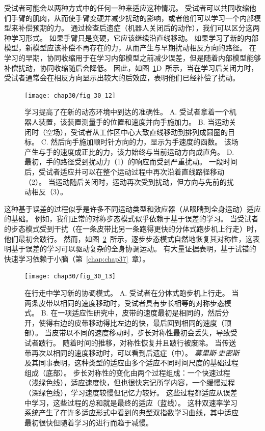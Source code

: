 受试者可能会以两种方式中的任何一种来适应这种情况。
受试者可以共同收缩他们手臂的肌肉，从而使手臂变硬并减少扰动的影响，或者他们可以学习一个内部模型来补偿预期的力。
通过检查后遗症（机器人关闭后的动作），我们可以区分这两种学习形式。
如果手臂只是变硬，它应该继续沿直线移动。
如果学习了新的内部模型，新模型应该补偿不再存在的力，从而产生与早期扰动相反方向的路径。
在学习的早期，协同收缩用于在学习内部模型之前减少误差，但是随着内部模型能够补偿扰动，协同收缩随后会降低。
因此，如图~\ref{fig:30_12}D~所示，当在学习后关闭力时，受试者通常会在相反方向显示出较大的后效应，表明他们已经补偿了扰动。


\begin{figure}[htbp]
	\centering
	\texttt{[image: chap30/fig\_30\_12]}
	\caption{学习提高了在新的动态环境中到达的准确性\cite{brashers1996consolidation}。
		A. 受试者拿着一个机器人装置，该装置测量手的位置和速度并向手施加力。
		B. 当运动关闭时（空场），受试者从工作区中心大致直线移动到排列成圆圈的目标。
		C. 然后向手施加顺时针方向的力，显示为手速度的函数。
		该场产生与手的速度成正比的力，该力始终与当前运动方向成直角。
		D. 最初，手的路径受到扰动力（1）的响应而受到严重扰动。
		一段时间后，受试者适应并可以在整个运动过程中再次沿着直线路径移动（2）。
		当运动随后关闭时，运动再次受到扰动，但方向与先前的扰动相反（3）。}
	\label{fig:30_12}
\end{figure}


这种基于误差的过程似乎是许多不同运动类型和效应器（从眼睛到全身运动）适应的基础。
例如，我们正常的对称步态模式似乎依赖于基于误差的学习。
当受试者的步态模式受到干扰（在一条皮带比另一条跑得更快的分体式跑步机上行走）时，他们最初会跛行。
然而，如图~\ref{fig:30_13}~所示，逐步步态模式自然地恢复其对称性，这表明基于误差的学习可以驱动复杂的全身协调运动。
有大量证据表明，基于试错的快速学习依赖于小脑（第~\ref{chap:chap37}~章）。


\begin{figure}[htbp]
	\centering
	\texttt{[image: chap30/fig\_30\_13]}
	\caption{在行走中学习新的协调模式。
		A. 受试者在分体式跑步机上行走。
		当两条皮带以相同的速度移动时，受试者具有步长相等的对称步态模式。
		B. 在一项适应性研究中，皮带的速度最初是相同的，然后分开，使得右边的皮带移动得比左边的快，最后回到相同的速度（顶部）。
		当皮带以不同的速度移动时，步长对称性最初会丢失，导致受试者跛行。
		随着时间的推移，对称性恢复并且跛行被废除。
		当传送带再次以相同的速度移动时，可以看到后遗症（中）。
		\textit{莫里斯$\cdot$史密斯}及其同事表明，这种类型的适应由多个适应不同时间尺度的基础过程组成（底部）。
		步长对称性的变化由两个过程组成：一个快速过程（浅绿色线），适应速度快，但也很快忘记所学内容，一个缓慢过程（深绿色线），学习速度较慢但记忆力较好。
		这些过程都适应从误差中学习，这些过程的总和就是最终的适应（蓝线）。
		这种双速率学习系统产生了在许多适应形式中看到的典型双指数学习曲线，其中适应最初很快但随着学习的进行而趋于减慢\cite{roemmich2016seeing}。}
	\label{fig:30_13}
\end{figure}


